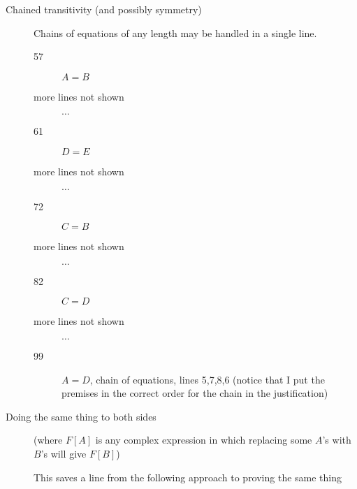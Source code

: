 \documentclass[12pt]{article}
\begin{document}
\begin{description}
\item[Chained transitivity (and possibly symmetry)]

Chains of equations of any length may be handled in a single line.

\begin{description}

\item[57]  $A=B$

\item[more lines not shown] $\ldots$

\item[61]  $D=E$

\item[more lines not shown] $\ldots$

\item[72]  $C=B$

\item[more lines not shown] $\ldots$

\item[82]  $C=D$

\item[more lines not shown] $\ldots$

\item[99]  $A=D$, chain of equations, lines 5,7,8,6  (notice that I put the premises in the correct order for the chain in the justification)

\end{description}

\item[Doing the same thing to both sides]


(where $F[A]$ is any complex expression in which replacing some $A$'s with $B$'s will give $F[B]$)

\newpage

This saves a line from the following approach to proving the same thing

\begin{description}


\end{description}
\end{description}
\end{document}
